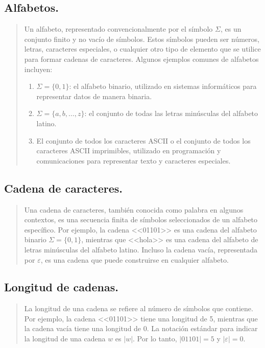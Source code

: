 \documentclass{article}
\begin{document}
    \subsection{Alfabetos.}
        \begin{quote}
            Un alfabeto, representado convencionalmente por el símbolo $\Sigma$, es un conjunto finito y no vacío de símbolos.
            Estos símbolos pueden ser números, letras, caracteres especiales, o cualquier otro tipo de elemento que se utilice para formar
            cadenas de caracteres. Algunos ejemplos comunes de alfabetos incluyen:

            \begin{enumerate}
                \item $\Sigma=\{0,1\}$: el alfabeto binario, utilizado en sistemas informáticos para representar datos de manera binaria.
                \item $\Sigma=\{a,b,\ldots,z\}$: el conjunto de todas las letras minúsculas del alfabeto latino.
                \item El conjunto de todos los caracteres ASCII o el conjunto de todos los caracteres ASCII imprimibles, utilizado en programación y comunicaciones
                para representar texto y caracteres especiales.\cite{hopcroft2007introduccion}
            \end{enumerate}
        \end{quote}
    \subsection{Cadena de caracteres.}
        \begin{quote}
            Una cadena de caracteres, también conocida como palabra en algunos contextos, es una secuencia finita de símbolos seleccionados de
            un alfabeto específico. Por ejemplo, la cadena <<01101>> es una cadena del alfabeto binario $\Sigma = \{0,1\}$, mientras que <<hola>>
            es una cadena del alfabeto de letras minúsculas del alfabeto latino. Incluso la cadena vacía, representada por $\varepsilon$, es
            una cadena que puede construirse en cualquier alfabeto.\cite{hopcroft2007introduccion}
        \end{quote}

    \subsection{Longitud de cadenas.}
        \begin{quote}
            La longitud de una cadena se refiere al número de símbolos que contiene. Por ejemplo, la cadena <<01101>> tiene una longitud
            de 5, mientras que la cadena vacía tiene una longitud de 0. La notación estándar para indicar la longitud de una cadena $w$
            es $|w|$. Por lo tanto, $|01101| = 5$ y $|\varepsilon| = 0$.\cite{hopcroft2007introduccion}
        \end{quote}
\end{document}
